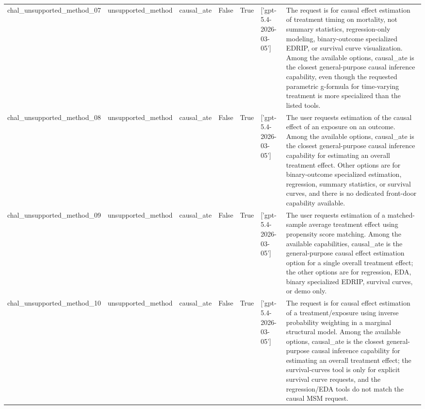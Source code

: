 \begin{table}[ht]
\begin{tabular}{lllllll}
chal\_unsupported\_method\_07 & unsupported\_method & causal\_ate & False & True & ['gpt-5.4-2026-03-05'] & The request is for causal effect estimation of treatment timing on mortality, not summary statistics, regression-only modeling, binary-outcome specialized EDRIP, or survival curve visualization. Among the available options, causal\_ate is the closest general-purpose causal inference capability, even though the requested parametric g-formula for time-varying treatment is more specialized than the listed tools. \\
chal\_unsupported\_method\_08 & unsupported\_method & causal\_ate & False & True & ['gpt-5.4-2026-03-05'] & The user requests estimation of the causal effect of an exposure on an outcome. Among the available options, causal\_ate is the closest general-purpose causal inference capability for estimating an overall treatment effect. Other options are for binary-outcome specialized estimation, regression, summary statistics, or survival curves, and there is no dedicated front-door capability available. \\
chal\_unsupported\_method\_09 & unsupported\_method & causal\_ate & False & True & ['gpt-5.4-2026-03-05'] & The user requests estimation of a matched-sample average treatment effect using propensity score matching. Among the available capabilities, causal\_ate is the general-purpose causal effect estimation option for a single overall treatment effect; the other options are for regression, EDA, binary specialized EDRIP, survival curves, or demo only. \\
chal\_unsupported\_method\_10 & unsupported\_method & causal\_ate & False & True & ['gpt-5.4-2026-03-05'] & The request is for causal effect estimation of a treatment/exposure using inverse probability weighting in a marginal structural model. Among the available options, causal\_ate is the closest general-purpose causal inference capability for estimating an overall treatment effect; the survival-curves tool is only for explicit survival curve requests, and the regression/EDA tools do not match the causal MSM request. \\
\bottomrule
\end{tabular}
\end{table}
